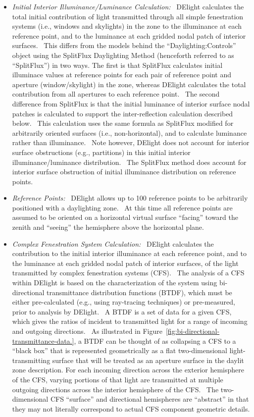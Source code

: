 \begin{itemize}
\item
  \emph{Initial Interior Illuminance/Luminance Calculation:}~ DElight calculates the total initial contribution of light transmitted through all simple fenestration systems (i.e., windows and skylights) in the zone to the illuminance at each reference point, and to the luminance at each gridded nodal patch of interior surfaces.~ This differs from the models behind the ``Daylighting:Controls'' object using the SplitFlux Daylighting Method (henceforth referred to as ``SplitFlux'') in two ways. The first is that SplitFlux calculates initial illuminace values at reference points for each pair of reference point and aperture (window/skylight) in the zone, whereas DElight calculates the total contribution from all apertures to each reference point.~ The second difference from SplitFlux is that the initial luminance of interior surface nodal patches is calculated to support the inter-reflection calculation described below.~ This calculation uses the same formula as SplitFlux modified for arbitrarily oriented surfaces (i.e., non-horizontal), and to calculate luminance rather than illuminance.~ Note however, DElight does not account for interior surface obstructions (e.g., partitions) in this initial interior illuminance/luminance distribution.~ The SplitFlux method does account for interior surface obstruction of initial illuminance distribution on reference points.
\item
  \emph{Reference Points:}~ DElight allows up to 100 reference points to be arbitrarily positioned with a daylighting zone.~ At this time all reference points are assumed to be oriented on a horizontal virtual surface ``facing'' toward the zenith and ``seeing'' the hemisphere above the horizontal plane.
\item
  \emph{Complex Fenestration System Calculation:}~ DElight calculates the contribution to the initial interior illuminance at each reference point, and to the luminance at each gridded nodal patch of interior surfaces, of the light transmitted by complex fenestration systems (CFS).~ The analysis of a CFS within DElight is based on the characterization of the system using bi-directional transmittance distribution functions (BTDF), which must be either pre-calculated (e.g., using ray-tracing techniques) or pre-measured, prior to analysis by DElight.~ A BTDF is a set of data for a given CFS, which gives the ratios of incident to transmitted light for a range of incoming and outgoing directions.~ As illustrated in Figure~\ref{fig:bi-directional-transmittance-data.}, a BTDF can be thought of as collapsing a CFS to a ``black box'' that is represented geometrically as a flat two-dimensional light-transmitting surface that will be treated as an aperture surface in the daylit zone description. For each incoming direction across the exterior hemisphere of the CFS, varying portions of that light are transmitted at multiple outgoing directions across the interior hemisphere of the CFS.~ The two-dimensional CFS ``surface'' and directional hemispheres are ``abstract'' in that they may not literally correspond to actual CFS component geometric details.
\end{itemize}

